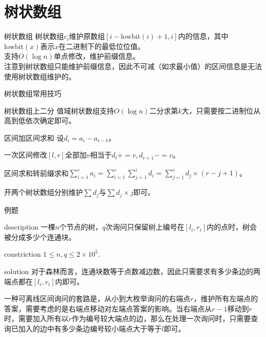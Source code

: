 \documentclass{beamer}
\begin{document}
	\section{树状数组}
	\begin{frame}{树状数组}
		树状数组$c_i$维护原数组$[i-\mathrm{lowbit}(i)+1,i]$内的信息，其中$\mathrm{lowbit}(x)$表示$x$在二进制下的最低位位值。\\
		
		支持$O(\log n)$单点修改，维护前缀信息。\\
		
		注意到树状数组只能维护前缀信息，因此不可减（如求最小值）的区间信息是无法使用树状数组维护的。
		
	\end{frame}
	\begin{frame}{树状数组常用技巧}
		\begin{block}{树状数组上二分}
			值域树状数组支持$O(\log n)$二分求第$k$大，只需要按二进制位从高到低依次确定即可。
		\end{block}
		\pause
		\begin{block}{区间加区间求和}
			设$d_i=a_i-a_{i-1}$。
			
			一次区间修改$[l,r]$全部加$v$相当于$d_l+=v,d_{r+1}-=v$。
			
			区间求和转前缀求和$\sum_{i=1}^r a_i=\sum_{i=1}^r\sum_{j=1}^id_i=\sum_{j=1}^rd_j\times(r-j+1)$。
			
			开两个树状数组分别维护$\sum d_j$与$\sum d_j\times j$即可。
		\end{block}
	\end{frame}
	\begin{frame}{例题}
		\begin{block}{description}
			一棵$n$个节点的树，$q$次询问只保留树上编号在$[l_i,r_i]$内的点时，树会被分成多少个连通块。
		\end{block}
		\begin{block}{constriction}
			$1 \le n, q \le 2\times10^5.$
		\end{block}
		\pause
		\begin{block}{solution}
			对于森林而言，连通块数等于点数减边数，因此只需要求有多少条边的两端点都在$[l_i,r_i]$内即可。
			
			一种可离线区间询问的套路是，从小到大枚举询问的右端点$r$，维护所有左端点的答案，需要考虑的是右端点移动对左端点答案的影响。当右端点从$r-1$移动到$r$时，需要加入所有以$r$作为编号较大端点的边，那么在处理一次询问时，只需要查询已加入的边中有多少条边编号较小端点大于等于$l$即可。
		\end{block}
	\end{frame}
\end{document}
